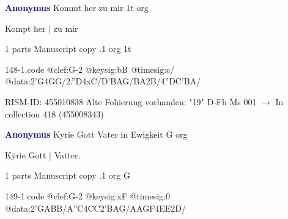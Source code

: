 \documentclass[twocolumn]{book}
\begin{document}
\newline \par \vspace{7pt} \textcolor{darkblue}{\textbf{Anonymus  }}
\newline Kommt her zu mir  1t  
\newline org
\newline \begin{itshape}[f.19v, at left:] Kompt her | zu mir\end{itshape} 
\newline \textcolor{darkblue}{}  1 parts  
\newline Manuscript copy
.1  org  1t  
\begin{filecontents*}{148-1.code}
@clef:G-2
@keysig:bB
@timesig:c/
@data:2'G4GG/2.''D4xC/D'BAG/BA2B/4''DC'BA/
\end{filecontents*}
\newline
%

\newline RISM-ID: 455010838
\newline Alte Foliierung vorhanden: "19"
\newline D-Fh  Ms 001
\newline $\rightarrow$ In collection 418 (455008343)

\newline \par \vspace{7pt} \textcolor{darkblue}{\textbf{Anonymus  }}
\newline Kyrie Gott Vater in Ewigkeit  G  
\newline org
\newline \begin{itshape}[f.18v, at left:] Kÿrie Gott | Vatter.\end{itshape} 
\newline \textcolor{darkblue}{}  1 parts  
\newline Manuscript copy
.1  org  G  
\begin{filecontents*}{149-1.code}
@clef:G-2
@keysig:xF
@timesig:0
@data:2'GABB/A''C4CC2'BAG/AAGF4EE2D/
\end{filecontents*}
\newline
%
\end{document}
